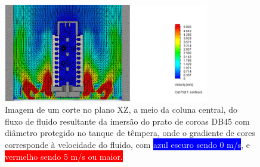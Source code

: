 \begin{figure}[htb]
    \centering
    \includegraphics[width = 0.8\textwidth]{Figures/Cap3/resultado_simples.png}
    \caption[Resultado da simulação CFD da têmpera das rodas de coroa com diâmetro protegido]%
    {Imagem de um corte no plano XZ, a meio da coluna central, do fluxo de fluido resultante da imersão do prato de coroas DB45 com diâmetro protegido no tanque de têmpera, onde o gradiente de cores corresponde à velocidade do fluido, com \colorbox{Blue}{\textcolor{White}{azul escuro sendo 0 m/s}}, e \colorbox{Red}{\textcolor{White}{vermelho sendo 5 m/s ou maior.}}}
    \label{fig:resultado_simples}
\end{figure}
\newpage
